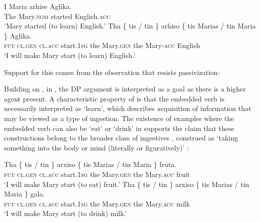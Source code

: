\documentclass[output=paper]{langscibook}
\begin{document}
\ea \label{alexiadouex:key:8}
    \ea
        \gll I Maria    arhise    Aglika. \\
        The Mary.\textsc{nom}  started    English.\textsc{acc} \\
        \glt ‘Mary started (to learn) English.’
    \ex
        \gll Tha  \{ tis / tin \} arhiso  \{ tis Marias / tin Maria \} Aglika.\\
        \textsc{fut} {} \textsc{cl.gen} {} \textsc{cl.acc} {} start.\textsc{1sg} {} the Mary.\textsc{gen} {} the Mary-\textsc{acc} {} English\\
        \glt `I will make Mary start (to learn) English.'
    \z 
\z

Support for this comes from the observation that  resists passivization:

\z 

Building on \citet{Anagnostopoulou2001}, in , the DP argument is interpreted as a goal as there is a higher agent present. 
A characteristic property of  is that the embedded verb is necessarily interpreted as ‘learn’, 
which describes acquisition of information that may be viewed as a type of ingestion. 
The existence of examples where the embedded verb can also be ‘eat’ or ‘drink’ in  supports the claim 
that these constructions belong to the broader class of ingestives \citep[213--217]{Levin1993}, 
construed as ‘taking something into the body or mind (literally or figuratively)’ \citep[46]{Masica1976}:

\ea%
    \label{alexiadouex:key:9}
    \ea
        \gll Tha  \{ tis / tin \} arxiso \{ tis Marias / tin Maria \} fruta.\\
        \textsc{fut} {} \textsc{cl.gen} {} \textsc{cl.acc} {} start.\textsc{1sg} {} the Mary.\textsc{gen} {} the Mary.\textsc{acc} {} fruit\\
        \glt  ‘I will make Mary start (to eat) fruit.’
    \ex
        \gll Tha \{ tis / tin \} arxiso \{ tis Marias / tin Maria \} gala.\\
        \textsc{fut} {} \textsc{cl.gen} {} \textsc{cl.acc} {} start.\textsc{1sg} {} the Mary.\textsc{gen} {} the Mary.\textsc{acc} {} milk\\
        \glt ‘I will make Mary start (to drink) milk.’
    \z 
\z 
\end{document}
